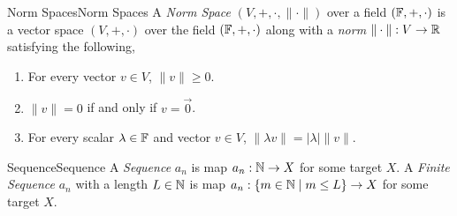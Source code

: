 \documentclass{article}
\begin{document}
\begin{definition}{Norm Spaces}{Norm Spaces}
    A \emph{Norm Space} $\left(V, +, \cdot, \|\cdot\|\right)$ over a field $\left(\mathbb{F}, +, \cdot\right)$
    is a vector space $\left(V, +, \cdot\right)$ over the field $\left(\mathbb{F}, +, \cdot\right)$ along with a \emph{norm} $\|\cdot\| : V \rightarrow \mathbb{R}$  satisfying the following,

    \begin{enumerate}[label=(\roman*)]
        \item For every vector $v \in V$, $\|v\| \geq 0$.
        \item $\|v\| = 0$ if and only if $v = \vec{0}$.
        \item For every scalar $\lambda \in \mathbb{F}$ and vector $v \in V$, $\|\lambda v\| = |\lambda|\|v\|$.
    \end{enumerate}
\end{definition}

\begin{definition}{Sequence}{Sequence}
    A \emph{Sequence} $a_n$ is map $a_n : \mathbb{N} \rightarrow X$ for some target $X$.
    A \emph{Finite Sequence} $a_n$ with a length $L \in \mathbb{N}$ is map $a_n : \{m \in \mathbb{N} \mid m \leq L\} \rightarrow X$ for some target $X$.
\end{definition}
\end{document}
